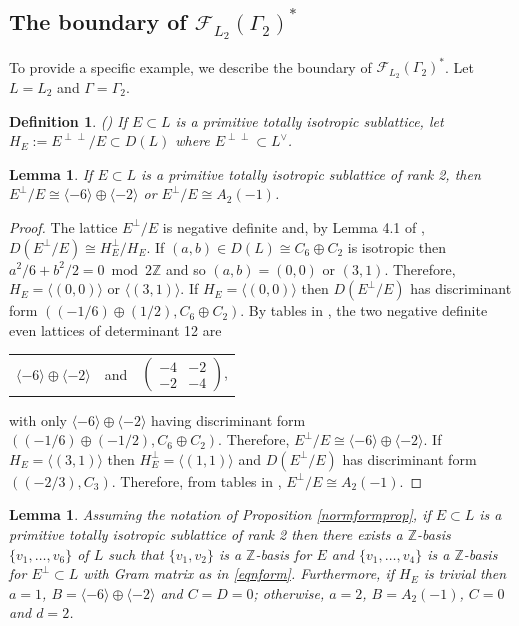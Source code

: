 \documentclass[11pt]{article}
\newtheorem{lem}[thm]{Lemma}
\newtheorem{defn}[thm]{Definition}
\newcommand{\ZZ}{\mathbb{Z}}
\newcommand{\fc}{\mathcal{F}}
\newcommand{\la}{\langle}
\newcommand{\ra}{\rangle}
\newcommand{\op}{\oplus}
\newcommand{\bpm}{\begin{pmatrix}}
\newcommand{\epm}{\end{pmatrix}}
\begin{document}
\subsection{The boundary of $\fc_{L_2}(\Gamma_2)^*$}
To provide a specific example, we describe the boundary of  $\fc_{L_2}(\Gamma_2)^*$.
Let $L=L_2$ and $\Gamma=\Gamma_2$.
\begin{defn}(\cite{Brieskorn})
  If $E \subset L$ is a primitive totally isotropic sublattice, let $H_E:=E^{\perp \perp}/E \subset D(L)$ where $E^{\perp \perp} \subset L^{\vee}$.
\end{defn}
\begin{lem}\label{HElem}
  If $E \subset L$ is a primitive totally isotropic sublattice of rank 2, then
$E^{\perp}/E \cong \la -6 \ra \op \la -2 \ra$ or $E^{\perp}/E \cong A_2(-1)$.
\end{lem}
\begin{proof}
The lattice $E^{\perp}/E$ is negative definite and, by Lemma 4.1 of \cite{Brieskorn}, $D(E^{\perp}/E) \cong H_E^{\perp}/H_E$.
If $(a,b) \in D(L) \cong C_6 \op C_2$ is isotropic then $a^2 / 6 + b^2 / 2 = 0 \bmod{2 \ZZ}$ and so $(a,b)=(0,0)$ or $(3,1)$.
Therefore, $H_E = \la (0,0) \ra$ or $\la (3,1) \ra$.
If $H_E = \la (0,0) \ra$ then $D(E^{\perp}/E)$ has discriminant form $((-1/6) \op (1/2), C_6 \op C_2)$.
By tables in \cite{SPLAG}, the two negative definite even lattices of determinant 12 are
\begin{center}
  \begin{tabular}{c c c}
$\la -6 \ra \op \la -2 \ra$
& and &
$ \bpm
    -4 & -2 \\
    -2 & -4
    \epm$,
  \end{tabular}
  \end{center}
with only $\la -6 \ra \op \la -2 \ra$ having discriminant form  $( (-1/6) \op (-1/2), C_6 \op C_2)$.
Therefore,  $E^{\perp} / E \cong \la -6 \ra \op \la -2 \ra$.
If $H_E = \la (3,1) \ra$ then $H_E^{\perp} = \la (1,1) \ra$ and $D(E^{\perp}/E)$ has discriminant form $( (-2/3), C_3)$.
Therefore, from tables in \cite{SPLAG}, $E^{\perp}/E \cong A_2(-1)$.
\end{proof}
\begin{lem}\label{normform2lem}
  Assuming the notation of Proposition \ref{normformprop}, if $E \subset L$ is a primitive totally isotropic sublattice of rank 2 then there exists a $\ZZ$-basis $\{v_1, \ldots, v_6 \}$ of $L$ such that $\{v_1, v_2 \}$ is a $\ZZ$-basis for $E$ and
  $\{v_1, \ldots, v_4 \}$ is a $\ZZ$-basis for $E^{\perp} \subset L$ with Gram matrix as in \eqref{eqnform}.
  Furthermore, if $H_E$ is trivial then $a=1$, $B = \la -6 \ra \op \la -2 \ra$ and $C=D=0$;
  otherwise, $a=2$, $B = A_2(-1)$, $C=0$ and $d=2$.
\end{lem}
\end{document}
